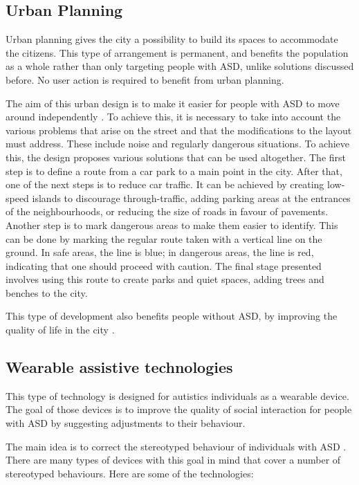 \subsection{Urban Planning}

Urban planning gives the city a possibility to build its spaces to accommodate the citizens. This type of arrangement is permanent, and benefits the population as a whole rather than only targeting people with ASD, unlike solutions discussed before. No user action is required to benefit from urban planning.

The aim of this urban design is to make it easier for people with ASD to move around independently \cite{2018MobilityPoliciesExtraSmall}. To achieve this, it is necessary to take into account the various problems that arise on the street and that the modifications to the layout must address. These include noise and regularly dangerous situations. To achieve this, the design proposes various solutions that can be used altogether. The first step is to define a route from a car park to a main point in the city. After that, one of the next steps is to reduce car traffic. It can be achieved by creating low-speed islands to discourage through-traffic, adding parking areas at the entrances of the neighbourhoods, or reducing the size of roads in favour of pavements. Another step is to mark dangerous areas to make them easier to identify. This can be done by marking the regular route taken with a vertical line on the ground. In safe areas, the line is blue; in dangerous areas, the line is red, indicating that one should proceed with caution. The final stage presented involves using this route to create parks and quiet spaces, adding trees and benches to the city.

This type of development also benefits people without ASD, by improving the quality of life in the city \cite{2018MobilityPoliciesExtraSmall}.

\subsection{Wearable assistive technologies}

This type of technology is designed for autistics individuals as a wearable device. The goal of those devices is to improve the quality of social interaction for people with ASD by suggesting adjustments to their behaviour.

The main idea is to correct the stereotyped behaviour of individuals with ASD \cite{2018WearableAssistiveTechnologies}. There are many types of devices with this goal in mind that cover a number of stereotyped behaviours. Here are some of the technologies:

